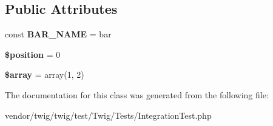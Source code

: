 \subsection*{Public Attributes}
\begin{DoxyCompactItemize}
\item 
const {\bfseries B\+A\+R\+\_\+\+N\+A\+ME} = \textquotesingle{}bar\textquotesingle{}\hypertarget{classTwigTestFoo_ad39127387f036340c8aaacf01f2c91fe}{}\label{classTwigTestFoo_ad39127387f036340c8aaacf01f2c91fe}

\item 
{\bfseries \$position} = 0\hypertarget{classTwigTestFoo_ad44f06f7a425c9a42315fbf5558d1eda}{}\label{classTwigTestFoo_ad44f06f7a425c9a42315fbf5558d1eda}

\item 
{\bfseries \$array} = array(1, 2)\hypertarget{classTwigTestFoo_a5ccb53f60166b2e9c7944a42089c1491}{}\label{classTwigTestFoo_a5ccb53f60166b2e9c7944a42089c1491}

\end{DoxyCompactItemize}


The documentation for this class was generated from the following file\+:\begin{DoxyCompactItemize}
\item 
vendor/twig/twig/test/\+Twig/\+Tests/Integration\+Test.\+php\end{DoxyCompactItemize}

